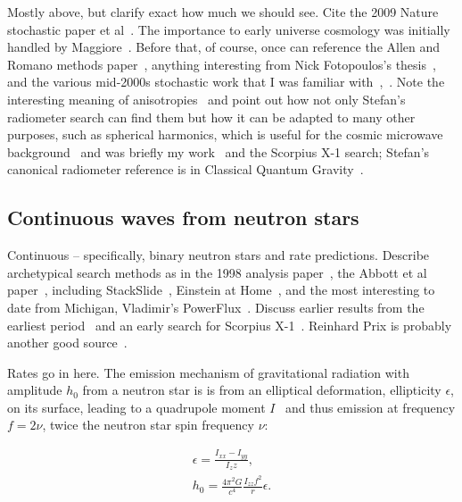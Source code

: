 		Mostly above, but clarify exact how much we should see. Cite the 2009 Nature stochastic paper et al~\cite{LIGOStochasticNature2009}. The importance to early universe cosmology was initially handled by Maggiore~\cite{Maggiore2000}. Before that, of course, once can reference the Allen and Romano methods paper~\cite{Allen1999}, anything interesting from Nick Fotopoulos's thesis~\cite{FotopoulosThesis}, and the various mid-2000s stochastic work that I was familiar with~\cite{Abbott2006},~\cite{Abbott2007}. Note the interesting meaning of anisotropies~\cite{Allen1997} and point out how not only Stefan's radiometer search can find them but how it can be adapted to many other purposes, such as spherical harmonics, which is useful for the cosmic microwave background~\cite{Muciaccia1997} and was briefly my work~\cite{MeadorsCaltech2007} and the Scorpius X-1 search; Stefan's canonical radiometer reference is in Classical Quantum Gravity~\cite{Radiometer2006}.

        \subsection{Continuous waves from neutron stars}
        \label{continuous_waves}

            Continuous -- specifically, binary neutron stars and rate predictions. Describe archetypical search methods as in the 1998 analysis paper~\cite{Jaranowski1998}, the Abbott et al paper~\cite{LSCPulsar2006}, including StackSlide~\cite{LSCPulsarS4}, Einstein at Home~\cite{LSCEinsteinHome2009}, and the most interesting to date from Michigan, Vladimir's PowerFlux~\cite{LSCPowerFlux2009}. Discuss earlier results from the earliest period~\cite{Abbott2004} and an early search for Scorpius X-1~\cite{AbbottPulsar2006}. Reinhard Prix is probably another good source~\cite{Prix2006}.

		Rates go in here.
        The emission mechanism of gravitational radiation with amplitude $h_0$ from a neutron star is is from an elliptical deformation, ellipticity $\epsilon$, on its surface, leading to a quadrupole moment $I$~\cite{LSCPulsar2006} and thus emission at frequency $f = 2\nu$, twice the neutron star spin frequency $\nu$:

        \begin{eqnarray}
        \epsilon = \frac{I_{xx} - I_{yy}}{I_zz}, \\
        h_0 = \frac{4 \pi^2 G}{c^4} \frac{I_{zz} f^2}{r} \epsilon.
        \end{eqnarray}

